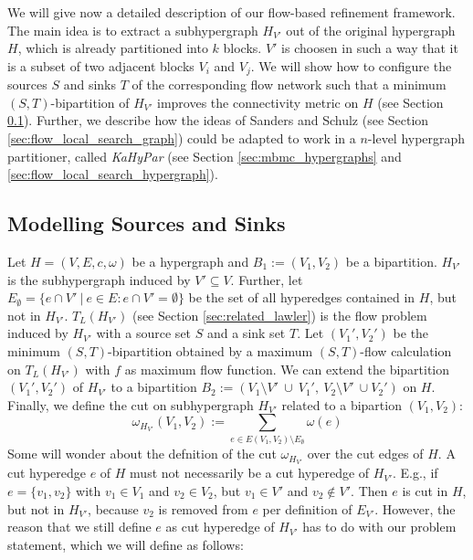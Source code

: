We will give now a detailed description of our flow-based refinement framework. The main
idea is to extract a subhypergraph $H_{V'}$ out of the original hypergraph $H$, which is already
partitioned into $k$ blocks. $V'$ is choosen in such a way that it is a subset of two
adjacent blocks $V_i$ and $V_j$. We will show how to configure
the sources $S$ and sinks $T$ of the corresponding flow network such that
a minimum $(S,T)$-bipartition of $H_{V'}$ improves the connectivity metric on $H$
(see Section \ref{sec:source_and_sink}). Further, we describe how the ideas of
Sanders and Schulz \cite{sanders2011engineering} (see Section \ref{sec:flow_local_search_graph}) 
could be adapted to work in a $n$-level hypergraph partitioner, called \emph{KaHyPar}
(see Section \ref{sec:mbmc_hypergraphs} and \ref{sec:flow_local_search_hypergraph}). 

\subsection{Modelling Sources and Sinks}
\label{sec:source_and_sink}

Let $H = (V,E,c,\omega)$ be a hypergraph and $B_1 := (V_1, V_2)$ be a bipartition.
$H_{V'}$ is the subhypergraph induced by $V' \subseteq V$. 
Further, let $E_{\emptyset} = \{ e \cap V'\ |\ e \in E: e \cap V' = \emptyset\} $
be the set of all hyperedges contained in $H$, but not in $H_{V'}$. $T_L(H_{V'})$ 
(see Section \ref{sec:related_lawler}) is the flow problem induced by $H_{V'}$ with a
source set $S$ and a sink set $T$. Let $(V_1',V_2')$ be the minimum $(S,T)$-bipartition
obtained by a maximum $(S,T)$-flow calculation on $T_L(H_{V'})$ with $f$ as maximum flow
function. We can extend the bipartition $(V_1',V_2')$ of $H_{V'}$ to a bipartition 
$B_2 := (V_1 \setminus V'\ \cup\ V_1',\ V_2 \setminus V'\ \cup V_2' )$ on $H$. Finally,
we define the cut on subhypergraph $H_{V'}$ related to a
bipartion $(V_1,V_2)$:
\[\omega_{H_{V'}}(V_1,V_2) := \sum_{e \in E(V_1,V_2) \setminus E_{\emptyset}} \omega(e) \]
Some will wonder about the defnition of the cut $\omega_{H_{V'}}$ over the
cut edges of $H$. A cut hyperedge $e$ of $H$ must not necessarily be a cut hyperedge
of $H_{V'}$. E.g., if $e = \{v_1,v_2\}$ with $v_1 \in V_1$ and $v_2 \in V_2$, but
$v_1 \in V'$ and $v_2 \notin V'$. Then $e$ is cut in $H$, but not in $H_{V'}$, because
$v_2$ is removed from $e$ per definition of $E_{V'}$. However, the reason that we still
define $e$ as cut hyperedge of $H_{V'}$ has to do with our problem statement, 
which we will define as follows:

